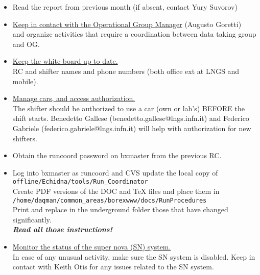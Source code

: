 \documentclass[a4paper,10pt]{article}
\begin{document}
\begin{itemize}
 \item Read the report from previous month (if absent, contact Yury  Suvorov)
\item \underline{Keep in contact with the Operational Group Manager}  (Augusto Goretti) \\ and organize activities that require a coordination between data taking group and OG.
 \item \underline{Keep the white board up to date.}\\ RC and shifter names and phone numbers (both office ext at LNGS and mobile).

 \item \underline{Manage cars, and access authorization.} \\ The shifter should be authorized to use a car (own or lab's) BEFORE the shift starts. 
 Benedetto Gallese (benedetto.gallese@lngs.infn.it) and Federico Gabriele (federico.gabriele@lngs.infn.it) will help with authorization for new shifters.
 \item Obtain the runcoord password on bxmaster from the previous RC.
  \item Log into bxmaster as runcoord and CVS update the local copy of \\
  {\tt offline/Echidna/tools/Run\_Coordinator} \\
Create PDF versions of the DOC and TeX files and place them in \\
  {\tt /home/daqman/common\_areas/borexwww/docs/RunProcedures}\\
  Print and replace in the underground folder those that have changed significantly. \\ \textbf{\emph{Read all those instructions!}}
\item \underline{Monitor the status of the super nova (SN) system.} \\  In case of any unusual activity, make sure the SN system is disabled. Keep in contact with Keith Otis for any issues related to the SN system.
\end{itemize}
\end{document}
